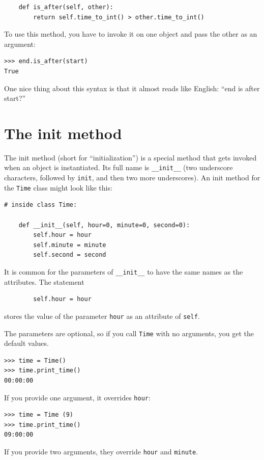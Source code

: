 \documentclass[10pt]{book}
\begin{document}
{\begin{verbatim}
    def is_after(self, other):
        return self.time_to_int() > other.time_to_int()
\end{verbatim}
\afterverb
%
To use this method, you have to invoke it on one object and pass
the other as an argument:

\beforeverb
\begin{verbatim}
>>> end.is_after(start)
True
\end{verbatim}
\afterverb
%
One nice thing about this syntax is that it almost reads
like English: ``end is after start?''


\section{The init method}


The init method (short for ``initialization'') is
a special method that gets invoked when an object is instantiated.  
Its full name is \verb"__init__" (two underscore characters,
followed by {\tt init}, and then two more underscores).  An
init method for the {\tt Time} class might look like this:

\beforeverb
\begin{verbatim}
# inside class Time:

    def __init__(self, hour=0, minute=0, second=0):
        self.hour = hour
        self.minute = minute
        self.second = second
\end{verbatim}
\afterverb
%
It is common for the parameters of \verb"__init__"
to have the same names as the attributes.  The statement

\beforeverb
\begin{verbatim}
        self.hour = hour
\end{verbatim}
\afterverb
%
stores the value of the parameter {\tt hour} as an attribute
of {\tt self}.


The parameters are optional, so if you call {\tt Time} with
no arguments, you get the default values.

\beforeverb
\begin{verbatim}
>>> time = Time()
>>> time.print_time()
00:00:00
\end{verbatim}
\afterverb
%
If you provide one argument, it overrides {\tt hour}:

\beforeverb
\begin{verbatim}
>>> time = Time (9)
>>> time.print_time()
09:00:00
\end{verbatim}
\afterverb
%
If you provide two arguments, they override {\tt hour} and
{\tt minute}.

}
\end{document}

